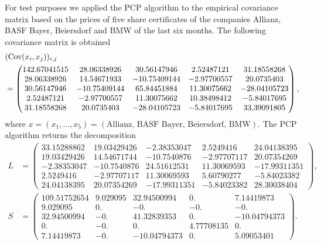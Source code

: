 For test purposes we applied the PCP algorithm to the empirical covariance matrix based on the prices of five share certificates of the companies Allianz, BASF Bayer, Beiersdorf and BMW  of the last six months. The following covariance matrix is obtained
\begin{align}
 &(\mathrm{Cov}(x_i,x_j))_{i,j} \notag \\
 &= \begin{pmatrix} 142.67041515&  28.06338926&  30.56147946&   2.52487121&
         31.18558268\\  28.06338926&  14.54671933& -10.75409144&  -2.97700557&
         20.0735403 \\  30.56147946& -10.75409144&  65.84451884&  11.30075662&
        -28.04105723\\   2.52487121&  -2.97700557&  11.30075662&  10.38498412&
         -5.84017695\\  31.18558268&  20.0735403 & -28.04105723&  -5.84017695&
         33.39091805 \end{pmatrix},
\end{align}
where $x = (x_1,\dots,x_5) =(\text{Allianz, BASF Bayer, Beiersdorf, BMW})$. The PCP algorithm returns the decomposition
\begin{align}
 L &= \begin{pmatrix}
       33.15288862&  19.03429426&  -2.38353047&   2.5249416 &
         24.04138395\\
         19.03429426&  14.54671744& -10.7540876 &  -2.97707117&
         20.07354269\\
         -2.38353047& -10.7540876 &  24.51612531&  11.30069593&
        -17.99311351\\ 
        2.5249416 &  -2.97707117&  11.30069593&   5.60790277&
         -5.84023382\\
         24.04138395&  20.07354269& -17.99311351&  -5.84023382&
         28.30038404
       \end{pmatrix},
       \\
S &=\begin{pmatrix}109.51752654&   9.029095  &  32.94500994&   0.        &
          7.14419873\\ 9.029095  &   0.        &  -0.        &  -0.        &
         -0.\\ 32.94500994&  -0.        &  41.32839353&   0.        &
        -10.04794373 \\ 0.        &  -0.        &   0.        &   4.77708135&
          0.        \\ 7.14419873&  -0.        & -10.04794373&   0.        &
          5.09053401
       \end{pmatrix}.
\end{align}
